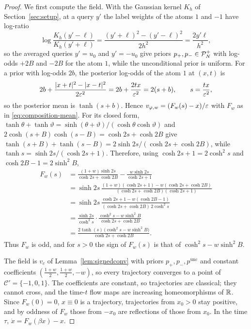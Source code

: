 \documentclass{article} %
\newcommand{\iclrbr}{\\&}\newcommand{\iclrbrq}{\\&\qquad}\newcommand{\iclrqbr}{\\&}
\newcommand{\iclrbr}{}\newcommand{\iclrbrq}{}\newcommand{\iclrqbr}{\qquad}
\theoremstyle{plain}
\theoremstyle{definition}
\theoremstyle{remark}
\begin{document}
\begin{proof}
We first compute the field. With the Gaussian kernel $K_h$ of Section~\ref{sec:setup}, at a query
$y'$ the label weights of the atoms $1$ and $-1$ have log-ratio
\[
\log\frac{K_h(y'-\ell)}{K_h(y'+\ell)}=\frac{(y'+\ell)^2-(y'-\ell)^2}{2h^2}=\frac{2y'\ell}{h^2},
\]
so the averaged queries $y'=u_0$ and $y'=-u_0$ give priors $p_+,p_-\in\mathcal{P}_N^{+}$ with log-odds $+2B$ and
$-2B$ for the atom $1$, while the unconditional prior is uniform. For a prior with log-odds $2b$,
the posterior log-odds of the atom $1$ at $(x,t)$ is
\[
2b+\frac{|x+t|^2-|x-t|^2}{2\varepsilon^2}=2b+\frac{2tx}{\varepsilon^2}=2(s+b),\qquad s=\frac{tx}{\varepsilon^2},
\]
so the posterior mean is $\tanh(s+b)$. Hence $v_{\varphi,w}=(F_w(s)-x)/\varepsilon$ with $F_w$ as in
\eqref{eq:composition-mean}. For its closed form, $\tanh\theta+\tanh\vartheta=
\sinh(\theta+\vartheta)/(\cosh\theta\cosh\vartheta)$ and
$2\cosh(s+B)\cosh(s-B)=\cosh2s+\cosh2B$ give
$\tanh(s+B)+\tanh(s-B)=2\sinh2s/(\cosh2s+\cosh2B)$, while $\tanh s=\sinh2s/(\cosh2s+1)$. Therefore,
using $\cosh2s+1=2\cosh^2s$ and $\cosh2B-1=2\sinh^2B$,
\begin{align*}
F_w(s)
&=\frac{(1+w)\sinh2s}{\cosh2s+\cosh2B}-\frac{w\sinh2s}{\cosh2s+1}
\iclrbr=\sinh2s\,\frac{(1+w)(\cosh2s+1)-w(\cosh2s+\cosh2B)}{(\cosh2s+\cosh2B)(\cosh2s+1)}\\
&=\sinh2s\,\frac{\cosh2s+1-w(\cosh2B-1)}{(\cosh2s+\cosh2B)\,2\cosh^2s}
\iclrbr=\frac{\sinh2s}{\cosh^2s}\cdot\frac{\cosh^2s-w\sinh^2B}{\cosh2s+\cosh2B}\\
&=\frac{2\tanh(s)\,\bigl(\cosh^2s-w\sinh^2B\bigr)}{\cosh2s+\cosh2B}.
\end{align*}
Thus $F_w$ is odd, and for $s>0$ the sign of $F_w(s)$ is that of $\cosh^2s-w\sinh^2B$.

The field is $v_c$ of Lemma~\ref{lem:signedconv} with priors $p_+,p_-,p^{\mathrm{unc}}$ and constant
coefficients $(\tfrac{1+w}2,\tfrac{1+w}2,-w)$, so every trajectory converges to a point of
$\mathcal C'=\{-1,0,1\}$. The coefficients are constant, so trajectories are classical; they cannot
cross, and the time-$t$ flow maps are increasing homeomorphisms of $\mathbb{R}$. Since $F_w(0)=0$,
$x\equiv0$ is a trajectory, trajectories from $x_0>0$ stay positive, and by oddness of $F_w$ those
from $-x_0$ are reflections of those from $x_0$. In the time $\tau$, $\dot x=F_w(\beta x)-x$.


\end{proof}
\end{document}
